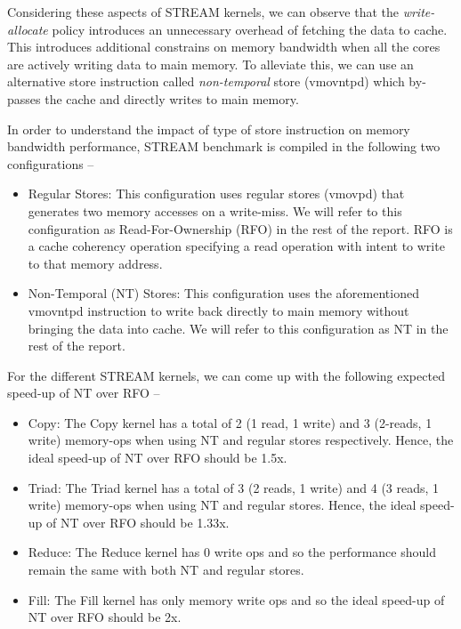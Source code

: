 \documentclass{article}
\begin{document}
Considering these aspects of STREAM kernels, we can observe that the \textit{write-allocate} policy introduces an unnecessary overhead of fetching the data to cache. This introduces additional constrains on memory bandwidth when all the cores are actively writing data to main memory. To alleviate this, we can use an alternative store instruction called \textit{non-temporal} store (vmovntpd) which by-passes the cache and directly writes to main memory.

In order to understand the impact of type of store instruction on memory bandwidth performance, STREAM benchmark is compiled in the following two configurations --
\begin{itemize}
\item Regular Stores: This configuration uses regular stores (vmovpd) that generates two memory accesses on a write-miss. We will refer to this configuration as Read-For-Ownership (RFO) in the rest of the report. RFO is a cache coherency operation specifying a read operation with intent to write to that memory address.
\item Non-Temporal (NT) Stores: This configuration uses the aforementioned vmovntpd instruction to write back directly to main memory without bringing the data into cache. We will refer to this configuration as NT in the rest of the report.
\end{itemize}

For the different STREAM kernels, we can come up with the following expected speed-up of NT over RFO --
\begin{itemize}
\item Copy: The Copy kernel has a total of 2 (1 read, 1 write) and 3 (2-reads, 1 write) memory-ops when using NT and regular stores respectively. Hence, the ideal speed-up of NT over RFO should be 1.5x.
\item Triad: The Triad kernel has a total of 3 (2 reads, 1 write) and 4 (3 reads, 1 write) memory-ops when using NT and regular stores. Hence, the ideal speed-up of NT over RFO should be 1.33x.
\item Reduce: The Reduce kernel has 0 write ops and so the performance should remain the same with both NT and regular stores.
\item Fill: The Fill kernel has only memory write ops and so the ideal speed-up of NT over RFO should be 2x.
\end{itemize}
\end{document}
